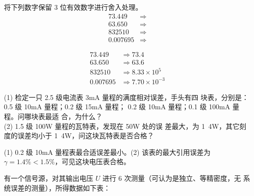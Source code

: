 \documentclass[a4paper,12pt]{examdesign}
\begin{document}
\begin{shortanswer}[title={二、计算题 (每题 10 分，共 80 分)}]

\begin{question}
将下列数字保留 3 位有效数字进行舍入处理。
        \begin{equation*}
        \begin{aligned}
            73.449 &\Rightarrow  \\
            63.650 &\Rightarrow  \\
            832510 &\Rightarrow   \\
            0.007695 &\Rightarrow  
        \end{aligned}
        \end{equation*}
    \examvspace*{0cm}
    \begin{answer}
        \begin{equation*}
        \begin{aligned}
            73.449 &\Rightarrow 73.4 \\
            63.650 &\Rightarrow 63.6 \\
            832510 &\Rightarrow 8.33 \times 10^5 \\
            0.007695 &\Rightarrow 7.70 \times 10^{-3}
        \end{aligned}
        \end{equation*}
    \end{answer}
\end{question}
\begin{question}
    (1) 检定一只 2.5 级电流表 \unit{3}{mA} 量程的满度相对误差，手头有四
    块表，分别是：0.5 级 \unit{10}{mA} 量程；0.2 级 \unit{15}{mA} 量程；
    0.2 级 \unit{10}{mA} 量程；0.1 级 \unit{100}{mA} 量程。问哪块表最适
    合，为什么？ \\
    (2) 1.5 级 \unit{100}{W} 量程的瓦特表，发现在 \unit{50}{W} 处的误
    差最大，为 \unit{1.4}{W}，其它刻度的误差均小于 \unit{1.4}{W}，问这块瓦特表是否合格？
    \examvspace*{5cm}
    \begin{answer}
        (1) 0.2 级 \unit{10}{mA} 量程表最合适误差最小。(2) 该表的最大引用误差为 $\gamma = 1.4\% < 1.5\%$，可见这块电压表合格。
    \end{answer}
\end{question}
\begin{question}
有一个信号源，对其输出电压 $U$ 进行 6 次测量（可认为是独立、等精密度，无
系统误差的测量），所得数据如下表：
\begin{table}[H]
\centering
\begin{tabular}{|r|c|c|c|c|c|c|}

\end{tabular}
\end{table}
\end{question}
\end{shortanswer}
\end{document}
